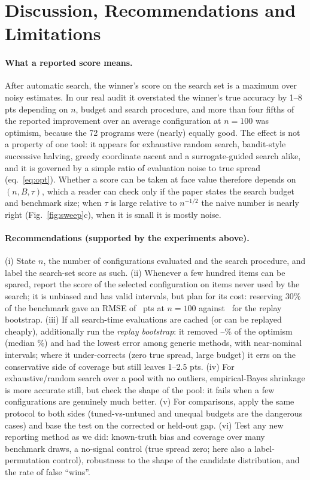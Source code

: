 \section{Discussion, Recommendations and Limitations}
\label{sec:disc}
\paragraph{What a reported score means.}
After automatic search, the winner's score on the search set is a maximum over noisy estimates. In our real audit it overstated the winner's true accuracy by 1--8 pts depending on $n$, budget and search procedure, and more than four fifths of the reported improvement over an average configuration at $n{=}100$ was optimism, because the 72 programs were (nearly) equally good. The effect is not a property of one tool: it appears for exhaustive random search, bandit-style successive halving, greedy coordinate ascent and a surrogate-guided search alike, and it is governed by a simple ratio of evaluation noise to true spread (eq.~\ref{eq:opt}). Whether a score can be taken at face value therefore depends on $(n,B,\tau)$, which a reader can check only if the paper states the search budget and benchmark size; when $\tau$ is large relative to $n^{-1/2}$ the naive number is nearly right (Fig.~\ref{fig:sweep}c), when it is small it is mostly noise.

\paragraph{Recommendations (supported by the experiments above).}
(i) State $n$, the number of configurations evaluated and the search procedure, and label the search-set score as such. (ii) Whenever a few hundred items can be spared, report the score of the selected configuration on items never used by the search; it is unbiased and has valid intervals, but plan for its cost: reserving 30\% of the benchmark gave an RMSE of \RmseHoldRSNHund\ pts at $n{=}100$ against \RmseBootRSNHund\ for the replay bootstrap. (iii) If all search-time evaluations are cached (or can be replayed cheaply), additionally run the \emph{replay bootstrap}: it removed \BootRemovedMin--\BootRemovedMax\% of the optimism (median \BootRemovedMed\%) and had the lowest error among generic methods, with near-nominal intervals; where it under-corrects (zero true spread, large budget) it errs on the conservative side of coverage but still leaves 1--2.5 pts. (iv) For exhaustive/random search over a pool with no outliers, empirical-Bayes shrinkage is more accurate still, but check the shape of the pool: it fails when a few configurations are genuinely much better. (v) For comparisons, apply the same protocol to both sides (tuned-vs-untuned and unequal budgets are the dangerous cases) and base the test on the corrected or held-out gap. (vi) Test any new reporting method as we did: known-truth bias and coverage over many benchmark draws, a no-signal control (true spread zero; here also a label-permutation control), robustness to the shape of the candidate distribution, and the rate of false ``wins''.

